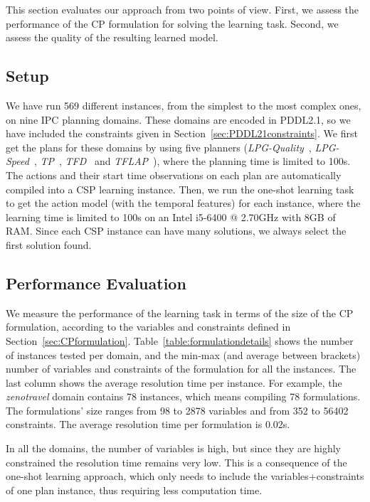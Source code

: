 \documentclass[10pt,journal,compsoc]{IEEEtran}
\begin{document}
This section evaluates our approach from two points of view. First, we assess the performance of the CP formulation for solving the learning task.
Second, we assess the quality of the resulting learned model.
 
 
\subsection{Setup}

We have run 569 different instances, from the simplest to the most complex ones, on nine IPC planning domains. These domains are encoded in PDDL2.1, so we have included the constraints given in Section~\ref{sec:PDDL21constraints}. We first get the plans for these domains by using five planners (\textit{LPG-Quality}~\cite{gerevini2003planning}, \textit{LPG-Speed}~\cite{gerevini2003planning}, \textit{TP}~\cite{jimenez2015temporal}, \textit{TFD}~\cite{eyerich2009using} and \textit{TFLAP}~\cite{marzal2016temporal}), where the planning time is limited to 100s.
The actions and their start time observations on each plan are automatically compiled into a CSP learning instance. Then,
we run the one-shot learning task to get the action model (with the temporal features) for each instance, where the learning time is limited to 100s on an Intel i5-6400 @ 2.70GHz with 8GB of RAM. Since each CSP instance can have many solutions, we always select the first solution found.



\subsection{Performance Evaluation}

We measure the performance of the learning task in terms of the size of the CP formulation, according to the variables and constraints defined in Section~\ref{sec:CPformulation}. Table~\ref{table:formulationdetails} shows the number of instances tested per domain, and the min-max (and average between brackets) number of variables and constraints of the formulation for all the instances. The last column shows the average resolution time per instance.
For example, the \emph{zenotravel} domain contains 78 instances, which means compiling 78 formulations. The formulations' size ranges from 98 to 2878 variables and from 352 to 56402 constraints. The average resolution time per formulation is 0.02s.

In all the domains, the number of variables is high, but since they are highly constrained the resolution time remains very low.
This is a consequence of the one-shot learning approach, which only needs to include the variables+constraints of one plan instance, thus requiring less computation time.
\end{document}

